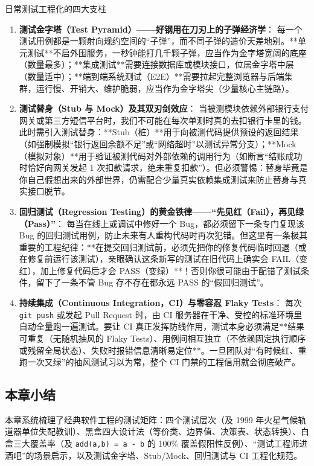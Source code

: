 \documentclass[a4paper]{article}
\begin{document}
\begin{knowledgebox}{日常测试工程化的四大支柱}
\begin{enumerate}
    \item \textbf{测试金字塔（Test Pyramid）——好钢用在刀刃上的子弹经济学}：
    每一个测试用例都是一颗射向规约空间的“子弹”，而不同子弹的造价天差地别。**单元测试**不启外围服务，一秒钟能打几千颗子弹，应当作为金字塔宽阔的底座（数量最多）；**集成测试**需要连接数据库或模块接口，位居金字塔中层（数量适中）；**端到端系统测试（E2E）**需要拉起完整浏览器与后端集群，运行慢、开销大、维护脆弱，应当作为金字塔尖（少量核心主链路）。
    \item \textbf{测试替身（Stub 与 Mock）及其双刃剑效应}：
    当被测模块依赖外部银行支付网关或第三方短信平台时，我们不可能在每次单测时真的去扣银行卡里的钱。此时需引入测试替身：**Stub（桩）**用于向被测代码提供预设的返回结果（如强制模拟“银行返回余额不足”或“网络超时”以测试异常分支）；**Mock（模拟对象）**用于验证被测代码对外部依赖的调用行为（如断言“结账成功时恰好向网关发起 $1$ 次扣款请求，绝未重复扣款”）。但必须警惕：替身毕竟是你自己假想出来的外部世界，仍需配合少量真实依赖集成测试来防止替身与真实接口脱节。
    \item \textbf{回归测试（Regression Testing）的黄金铁律——“先见红（Fail），再见绿（Pass）”}：
    每当在线上或调试中修好一个 Bug，都必须留下一条专门复现该 Bug 的回归测试用例，防止未来有人重构代码时再次犯错。但这里有一条极其重要的工程纪律：**在提交回归测试前，必须先把你的修复代码临时回退（或在修复前运行该测试），亲眼确认这条新写的测试在旧代码上确实会 FAIL（变红），加上修复代码后才会 PASS（变绿）**！否则你很可能由于配错了测试条件，留下了一条不管 Bug 存不存在都永远 PASS 的“假回归测试”。
    \item \textbf{持续集成（Continuous Integration，CI）与零容忍 Flaky Tests}：
    每次 \texttt{git push} 或发起 Pull Request 时，由 CI 服务器在干净、受控的标准环境里自动全量跑一遍测试。要让 CI 真正发挥防线作用，测试本身必须满足**结果可重复（无随机抽风的 Flaky Tests）、用例间相互独立（不依赖固定执行顺序或残留全局状态）、失败时报错信息清晰易定位**。一旦团队对“有时候红、重跑一次又绿”的抽风测试习以为常，整个 CI 门禁的工程信用就会彻底破产。
\end{enumerate}
\end{knowledgebox}

\subsection{本章小结}

本章系统梳理了经典软件工程的测试矩阵：四个测试层次（及 1999 年火星气候轨道器单位失配教训）、黑盒四大设计法（等价类、边界值、决策表、状态转换）、白盒三大覆盖率（及 \texttt{add(a,b) = a - b} 的 100\% 覆盖假阳性反例）、“测试工程师进酒吧”的场景启示，以及测试金字塔、Stub/Mock、回归测试与 CI 工程化规范。
\end{document}
